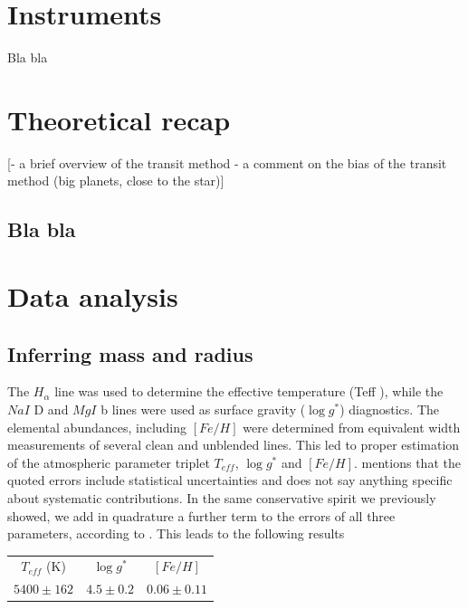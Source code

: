 \documentclass[a4paper,11pt,twocolumn]{article}
\begin{document}
\section{Instruments}

Bla bla



\section{Theoretical recap}

[- a brief overview of the transit method
- a comment on the bias of the transit method (big planets, close to the star)]




\subsection{Bla bla}

\section{Data analysis}

\subsection{Inferring mass and radius}

The $H_{\alpha}$ line was used to determine the effective temperature (Teff ),
while the $NaI$ D and $MgI$ b lines were used as surface gravity
($\log{g^*}$) diagnostics. The elemental abundances, including $[Fe/H]$ 
were determined from equivalent width measurements of several clean and 
unblended lines. This led to proper estimation of the atmospheric parameter 
triplet $T_{eff}$, $\log{g^*}$ and $[Fe/H]$. \cite*{Anderson} mentions that the quoted errors 
include statistical uncertainties and does not say anything specific about 
systematic contributions. In the same conservative spirit we previously 
showed, we add in quadrature a further term to the errors of all three 
parameters, according to \cite*{Sousa}.
This leads to the following results 
\begin{center}
    \begin{tabular}{|c|c|c|}
    \hline
    $T_{eff}$ (K) & $\log{g^*}$ & $[Fe/H]$ \\
    $5400 \pm 162$ & $4.5 \pm 0.2$ & $0.06 \pm 0.11$ \\
    \hline
    \end{tabular}
    \end{center}
\end{document}
